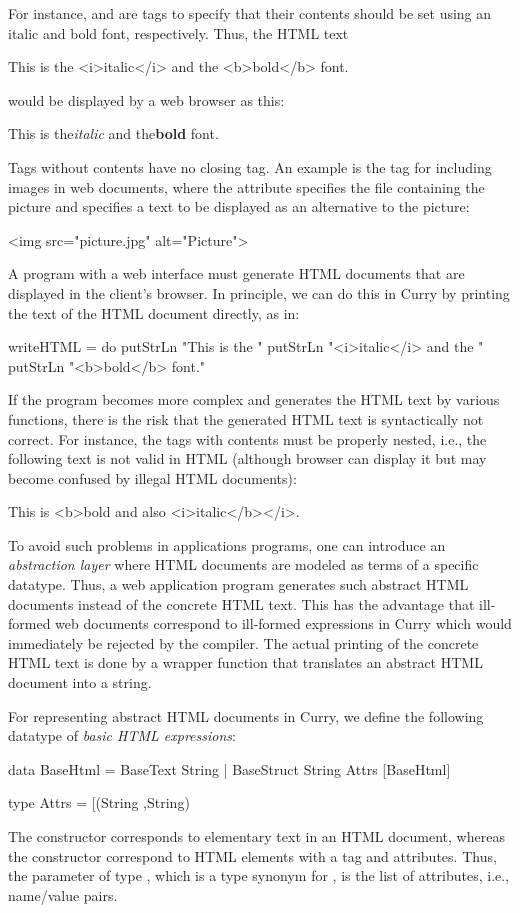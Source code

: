 For instance,  and  are tags to specify that
their contents should be set using an italic and bold font, respectively.
Thus, the HTML text
\begin{curry}
This is the <i>italic</i> and the <b>bold</b> font.
\end{curry}
would be displayed by a web browser as this:
\begin{prog}
{\rm This is the{\it italic} and the{\bf bold} font.}
\end{prog}
Tags without contents have no closing tag. An example
is the tag for including images in web documents, where the
attribute  specifies the file containing the picture
and  specifies a text to be displayed as an alternative
to the picture:
\begin{curry}
<img src="picture.jpg" alt="Picture">
\end{curry}
A program with a web interface must generate HTML documents
that are displayed in the client's browser.
In principle, we can do this in Curry by printing
the text of the HTML document directly, as in:
\begin{curry}
writeHTML = do
  putStrLn "This is the "
  putStrLn "<i>italic</i> and the "
  putStrLn "<b>bold</b> font."
\end{curry}
If the program becomes more complex and generates the HTML text
by various functions, there is the risk that the generated HTML text
is syntactically not correct. For instance, the tags with contents
must be properly nested, i.e., the following text is not valid in HTML
(although browser can display it but may become confused by illegal
HTML documents):
\begin{curry}
This is <b>bold and also <i>italic</b></i>.
\end{curry}
%
To avoid such problems in applications programs,
one can introduce an \emph{abstraction layer}
where HTML documents are modeled as terms of
a specific datatype.
Thus, a web application program generates such abstract HTML documents
instead of the concrete HTML text.
This has the advantage that ill-formed web documents correspond
to ill-formed expressions in Curry which would immediately be rejected
by the compiler. The actual printing of the concrete HTML text
is done by a wrapper function that translates an abstract HTML document
into a string.

For representing abstract HTML documents in Curry,
we define the following datatype of
\emph{basic HTML expressions}:
\begin{curry}
data BaseHtml = BaseText String
              | BaseStruct String Attrs [BaseHtml]

type Attrs = [(String ,String)
\end{curry}
%
The constructor  corresponds to elementary text
in an HTML document, whereas the constructor 
correspond to HTML elements with a tag and attributes.
Thus, the parameter of type ,
which is a type synonym for ,
is the list of attributes, i.e., name/value pairs.

